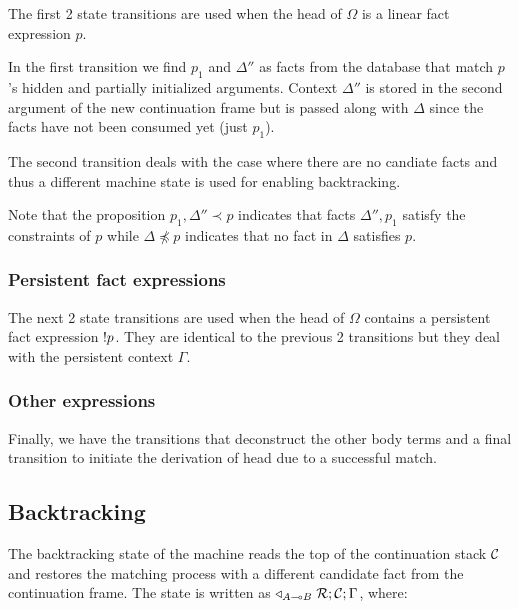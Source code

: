 The first 2 state transitions are used when the head of $\Omega$ is a linear fact
expression $p$.

In the first transition we find $p_1$ and $\Delta''$ as facts from the database
that match $p$'s hidden and partially initialized arguments.  Context $\Delta''$
is stored in the second argument of the new continuation frame but is passed
along with $\Delta$ since the facts have not been consumed yet (just $p_1$).

The second transition deals with the case where there are no candiate facts and
thus a different machine state is used for enabling backtracking.

Note that the proposition $p_1, \Delta'' \prec p$ indicates that facts
$\Delta'', p_1$ satisfy the constraints of $p$ while $\Delta \npreceq p$
indicates that no fact in $\Delta$ satisfies $p$.



\subsubsection{Persistent fact expressions}

The next 2 state transitions are used when the head of $\Omega$ contains a
persistent fact expression ${!} p$. They are identical to the previous 2
transitions but they deal with the persistent context $\Gamma$.



\subsubsection{Other expressions}

Finally, we have the transitions that deconstruct the other body terms and a
final transition to initiate the derivation of head due to a successful match.



\subsection{Backtracking}\label{sec:lld_match_cont}

The backtracking state of the machine reads the top of the continuation stack
$\mathcal{C}$ and restores the matching process with a different candidate fact
from the continuation frame. The state is written as $\triangleleft_{A \multimap
B} \; \mathcal{R}; \mathcal{C}; \Gamma$, where:

